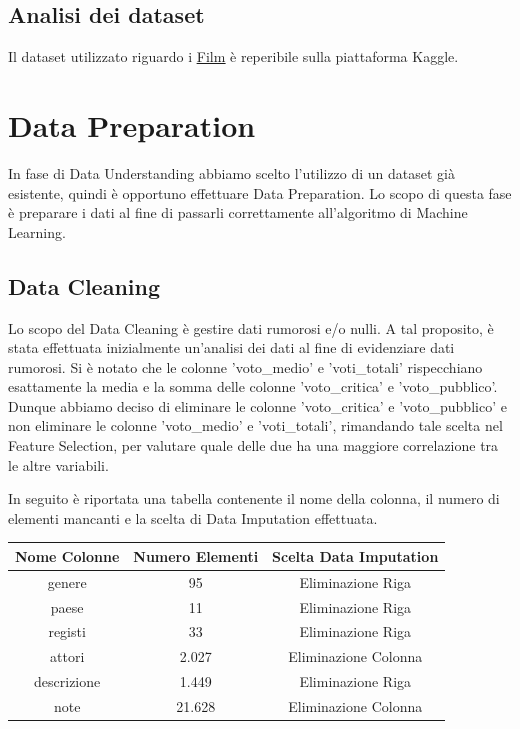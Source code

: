 \documentclass[a4paper, 10pt]{report}
\begin{document}
        \section{Analisi dei dataset}\label{sec:analisi-dei-dataset}
            Il dataset utilizzato riguardo i \href{https://www.kaggle.com/datasets/stefanoleone992/filmtv-movies-dataset?resource=download}{\underline{Film}}
            è reperibile sulla piattaforma Kaggle.


    \chapter{Data Preparation}\label{ch:data-preparation}
        In fase di Data Understanding abbiamo scelto l'utilizzo di un dataset già esistente, quindi è opportuno effettuare Data Preparation.
        Lo scopo di questa fase è preparare i dati al fine di passarli correttamente all'algoritmo di Machine Learning.

        \section{Data Cleaning}\label{sec:data-cleaning}
            Lo scopo del Data Cleaning è gestire dati rumorosi e/o nulli.
            A tal proposito, è stata effettuata inizialmente un'analisi dei dati al fine di evidenziare dati rumorosi.
            Si è notato che le colonne 'voto\_medio' e 'voti\_totali' rispecchiano esattamente la media e la somma delle colonne
            'voto\_critica' e 'voto\_pubblico'. Dunque abbiamo deciso di eliminare le colonne 'voto\_critica' e 'voto\_pubblico' e
            non eliminare le colonne 'voto\_medio' e 'voti\_totali', rimandando tale scelta nel Feature Selection, per valutare
            quale delle due ha una maggiore correlazione tra le altre variabili.

            In seguito è riportata una tabella contenente il nome della colonna, il numero di elementi mancanti e la scelta di
            Data Imputation effettuata.\\

            \begin{center}
                \begin{tabular}{ |c|c|c| }
                    \hline \rowcolor{Goldenrod} Nome Colonne & Numero Elementi & Scelta Data Imputation \\
                    \hline genere & 95 & Eliminazione Riga \\
                    \hline paese & 11 & Eliminazione Riga \\
                    \hline registi & 33 & Eliminazione Riga \\
                    \hline attori & 2.027 & Eliminazione Colonna \\
                    \hline descrizione & 1.449 & Eliminazione Riga \\
                    \hline note & 21.628 & Eliminazione Colonna \\
                    \hline
                \end{tabular}
                \\
            \end{center}
\end{document}
